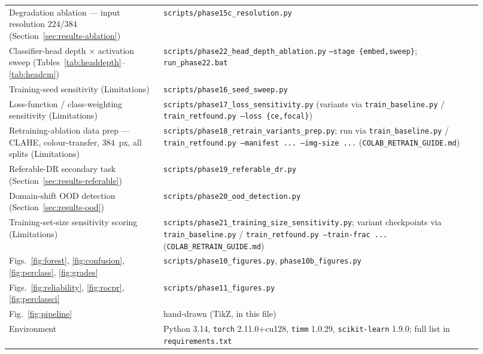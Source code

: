 \documentclass[journal]{IEEEtran}
\begin{document}
\begin{table}[!t]
\begin{tabular}{@{}p{0.30\linewidth} p{0.62\linewidth}@{}}
Degradation ablation --- input resolution $224$/$384$ (Section~\ref{sec:results-ablation}) & \texttt{scripts/phase15c\_resolution.py} \\
Classifier-head depth $\times$ activation sweep (Tables~\ref{tab:headdepth}--\ref{tab:headcm}) & \texttt{scripts/}\allowbreak\texttt{phase22\_head\_depth\_ablation.py} \newline \texttt{--stage \{embed,sweep\}}; \texttt{run\_phase22.bat} \\
Training-seed sensitivity (Limitations) & \texttt{scripts/phase16\_seed\_sweep.py} \\
Loss-function / class-weighting sensitivity (Limitations) & \texttt{scripts/phase17\_loss\_sensitivity.py} (variants via \texttt{train\_baseline.py} / \texttt{train\_retfound.py --loss \{ce,focal\}}) \\
Retraining-ablation data prep --- CLAHE, colour-transfer, $384$~px, all splits (Limitations) & \texttt{scripts/phase18\_retrain\_variants\_prep.py}; run via \texttt{train\_baseline.py} / \texttt{train\_retfound.py --manifest ... --img-size ...} (\texttt{COLAB\_RETRAIN\_GUIDE.md}) \\
Referable-DR secondary task (Section~\ref{sec:results-referable}) & \texttt{scripts/phase19\_referable\_dr.py} \\
Domain-shift OOD detection (Section~\ref{sec:results-ood}) & \texttt{scripts/phase20\_ood\_detection.py} \\
Training-set-size sensitivity scoring (Limitations) & \texttt{scripts/phase21\_training\_size\_sensitivity.py}; variant checkpoints via \texttt{train\_baseline.py} / \texttt{train\_retfound.py --train-frac ...} (\texttt{COLAB\_RETRAIN\_GUIDE.md}) \\
Figs.~\ref{fig:forest}, \ref{fig:confusion}, \ref{fig:perclass}, \ref{fig:grades} & \texttt{scripts/phase10\_figures.py}, \texttt{phase10b\_figures.py} \\
Figs.~\ref{fig:reliability}, \ref{fig:rocpr}, \ref{fig:perclassci} & \texttt{scripts/phase11\_figures.py} \\
Fig.~\ref{fig:pipeline} & hand-drawn (TikZ, in this file) \\
Environment & Python 3.14, \texttt{torch} 2.11.0+cu128, \texttt{timm} 1.0.29, \texttt{scikit-learn} 1.9.0; full list in \texttt{requirements.txt} \\
\bottomrule
\end{tabular}
\end{table}
\end{document}
